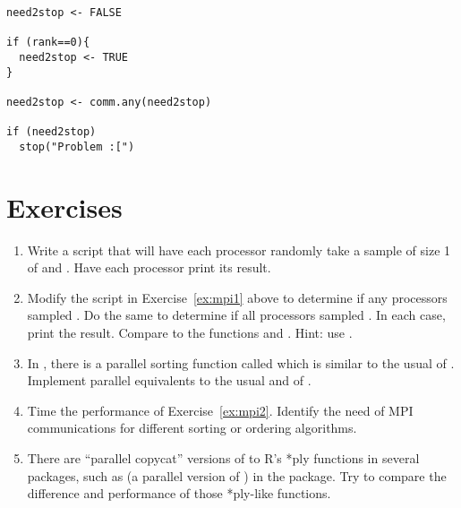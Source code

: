 \begin{lstlisting}[language=rr,title=R Code]
need2stop <- FALSE

if (rank==0){
  need2stop <- TRUE
}

need2stop <- comm.any(need2stop)

if (need2stop)
  stop("Problem :[") 
\end{lstlisting}






\section{Exercises}
\label{sec:mpi_for_the_r_user_exercise}

\begin{enumerate}[label=\thechapter-\arabic*]
\item Write a script that will have each processor randomly take a sample of
      size 1 of  and . Have each processor print its
      result.\label{ex:mpi1}

\item 
Modify the script in Exercise~\ref{ex:mpi1} above to determine if any
processors sampled . Do the same to determine if all processors 
sampled . In each case, print the result. Compare to the functions 
 and . {\color{blue} Hint:  use 
.} 

\item In , there is a parallel sorting function called      
 which is similar to the usual  of 
. Implement parallel equivalents to the usual  
and  of .\label{ex:mpi2}

\item 
Time the performance of Exercise~\ref{ex:mpi2}. Identify the need of MPI 
communications for different sorting or ordering algorithms.

\item 
There are ``parallel copycat'' versions of to R's *ply functions in several 
 packages, such as  (a parallel version of 
) in the  package.
Try to compare the difference and performance of those *ply-like functions.

\end{enumerate}



